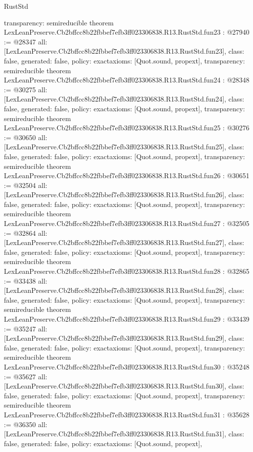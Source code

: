 \begin{lexlean}{RustStd}
\begin{coremodule}
{  transparency: semireducible
}
theorem LexLeanPreserve.Cb2bffcc8b22fbbef7efb3ff023306838.R13.RustStd.fun23 : @27940 := @28347 {
  all: [LexLeanPreserve.Cb2bffcc8b22fbbef7efb3ff023306838.R13.RustStd.fun23],
  class: false,
  generated: false,
  policy: exact{axioms: [Quot.sound, propext]},
  transparency: semireducible
}
theorem LexLeanPreserve.Cb2bffcc8b22fbbef7efb3ff023306838.R13.RustStd.fun24 : @28348 := @30275 {
  all: [LexLeanPreserve.Cb2bffcc8b22fbbef7efb3ff023306838.R13.RustStd.fun24],
  class: false,
  generated: false,
  policy: exact{axioms: [Quot.sound, propext]},
  transparency: semireducible
}
theorem LexLeanPreserve.Cb2bffcc8b22fbbef7efb3ff023306838.R13.RustStd.fun25 : @30276 := @30650 {
  all: [LexLeanPreserve.Cb2bffcc8b22fbbef7efb3ff023306838.R13.RustStd.fun25],
  class: false,
  generated: false,
  policy: exact{axioms: [Quot.sound, propext]},
  transparency: semireducible
}
theorem LexLeanPreserve.Cb2bffcc8b22fbbef7efb3ff023306838.R13.RustStd.fun26 : @30651 := @32504 {
  all: [LexLeanPreserve.Cb2bffcc8b22fbbef7efb3ff023306838.R13.RustStd.fun26],
  class: false,
  generated: false,
  policy: exact{axioms: [Quot.sound, propext]},
  transparency: semireducible
}
theorem LexLeanPreserve.Cb2bffcc8b22fbbef7efb3ff023306838.R13.RustStd.fun27 : @32505 := @32864 {
  all: [LexLeanPreserve.Cb2bffcc8b22fbbef7efb3ff023306838.R13.RustStd.fun27],
  class: false,
  generated: false,
  policy: exact{axioms: [Quot.sound, propext]},
  transparency: semireducible
}
theorem LexLeanPreserve.Cb2bffcc8b22fbbef7efb3ff023306838.R13.RustStd.fun28 : @32865 := @33438 {
  all: [LexLeanPreserve.Cb2bffcc8b22fbbef7efb3ff023306838.R13.RustStd.fun28],
  class: false,
  generated: false,
  policy: exact{axioms: [Quot.sound, propext]},
  transparency: semireducible
}
theorem LexLeanPreserve.Cb2bffcc8b22fbbef7efb3ff023306838.R13.RustStd.fun29 : @33439 := @35247 {
  all: [LexLeanPreserve.Cb2bffcc8b22fbbef7efb3ff023306838.R13.RustStd.fun29],
  class: false,
  generated: false,
  policy: exact{axioms: [Quot.sound, propext]},
  transparency: semireducible
}
theorem LexLeanPreserve.Cb2bffcc8b22fbbef7efb3ff023306838.R13.RustStd.fun30 : @35248 := @35627 {
  all: [LexLeanPreserve.Cb2bffcc8b22fbbef7efb3ff023306838.R13.RustStd.fun30],
  class: false,
  generated: false,
  policy: exact{axioms: [Quot.sound, propext]},
  transparency: semireducible
}
theorem LexLeanPreserve.Cb2bffcc8b22fbbef7efb3ff023306838.R13.RustStd.fun31 : @35628 := @36350 {
  all: [LexLeanPreserve.Cb2bffcc8b22fbbef7efb3ff023306838.R13.RustStd.fun31],
  class: false,
  generated: false,
  policy: exact{axioms: [Quot.sound, propext]},
}
\end{coremodule}
\end{lexlean}
